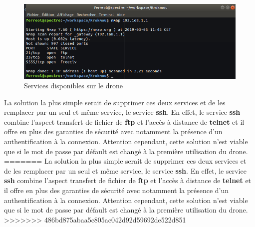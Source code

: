 \begin{figure}[H]
  \centering
  \includegraphics[scale=0.5]{images/scan_drone}
  \caption{Services disponibles sur le drone}
\end{figure}

La solution la plus simple serait de supprimer ces deux services et de les remplacer par un seul et même service, le service \textbf{ssh}. En effet, le service \textbf{ssh} combine l'aspect transfert de fichier de \textbf{ftp} et l'accès à distance de \textbf{telnet} et il offre en plus des garanties de sécurité avec notamment la présence d'un authentification à la connexion. Attention cependant, cette solution n'est viable que si le mot de passe par défault est changé à la première utilisation du drone.
=======
La solution la plus simple serait de supprimer ces deux services et de les remplacer par un seul et même service, le service \textbf{ssh}. En effet, le service \textbf{ssh} combine l'aspect transfert de fichier de \textbf{ftp} et l'accès à distance de \textbf{telnet} et il offre en plus des garanties de sécurité avec notamment la présence d'un authentification à la connexion. Attention cependant, cette solution n'est viable que si le mot de passe par défault est changé à la première utilisation du drone. 
>>>>>>> 486bd875abaa5c805ac042d92d59692de522d851
